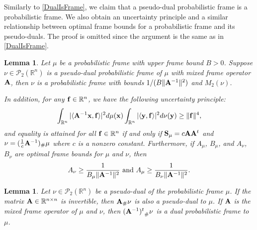 \documentclass{amsart}
\numberwithin{equation}{section}
\theoremstyle{plain}
\newtheorem{lemma}[theorem]{Lemma}
\theoremstyle{remark}
\theoremstyle{definition}
\begin{document}
Similarly to \cref{DualIsFrame}, we claim that a pseudo-dual probabilistic frame is a probabilistic frame. We also obtain an uncertainty principle and a similar relationship between optimal frame bounds for a probabilistic frame and its pseudo-duals. The proof is omitted since the argument is the same as in \cref{DualIsFrame}. 


\begin{lemma}
    Let $\mu$ be a probabilistic frame with upper frame bound $B>0$.  Suppose $\nu \in \mathcal{P}_2(\mathbb{R}^n)$ is a pseudo-dual probabilistic frame of $\mu$ with mixed frame operator $\bf A$, then $\nu$ is a probabilistic frame with bounds $ 1/(B \| {\bf A}^{-1}\|^2)$ and $M_2(\nu)$. 
    
In addition, for any ${\bf f} \in \mathbb{R}^n$, we have the following uncertainty principle:
     \begin{equation*}
        \int_{\mathbb{R}^n} |\langle {\bf A }^{-1} {\bf x}, {\bf f} \rangle| ^2 d\mu({\bf x}) \int_{\mathbb{R}^n} |\langle {\bf y}, {\bf f} \rangle| ^2 d\nu({\bf y})  \geq \| {\bf f} \|^4,
    \end{equation*}
and equality is attained for all ${\bf f} \in \mathbb{R}^n$  if and only if  ${\bf S}_{\mu}=c{\bf A}{\bf A}^{t}$ and
$\nu=(\frac{1}{c}{\bf A}^{-1})_{\#}\mu$ where $c$ is a nonzero constant.
Furthermore, if $A_\mu$, $B_\mu$, and $A_\nu$, $B_\nu$ are optimal frame bounds for $\mu$ and $\nu$, then 
\begin{equation*}
    A_\nu \geq \frac{1}{B_\mu \| {\bf A}^{-1}\|^2} \ \text{and} \  A_\mu \geq \frac{1}{B_\nu \| {\bf A}^{-1}\|^2}.
\end{equation*}
\end{lemma}

\begin{lemma}\label{lem:pushpseudo}
Let $\nu \in \mathcal{P}_2(\mathbb{R}^n)$ be a pseudo-dual of the probabilistic frame $\mu$. If the matrix ${\bf A} \in \mathbb{R}^{n \times n}$ is invertible,  then ${\bf A}_\# \nu$ is also a pseudo-dual to $\mu$. If ${\bf A}$ is  the mixed frame operator of $\mu$ and $\nu$, then ${({\bf A}^{-1})^t}_\# \nu$ is a dual probabilistic frame to $\mu$. 
\end{lemma}
    
\end{document}
